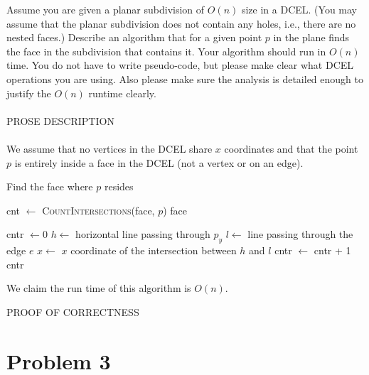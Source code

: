 \documentclass[11pt]{article}
\begin{document}
Assume you are given a planar subdivision of $O(n)$ size in a DCEL. (You may
assume that the planar subdivision does not contain any holes, i.e., there are
no nested faces.) Describe an algorithm that for a given point $p$ in the plane
finds the face in the subdivision that contains it. Your algorithm should run in
$O(n)$ time. You do not have to write pseudo-code, but please make clear what
DCEL operations you are using. Also please make sure the analysis is detailed
enough to justify the $O(n)$ runtime clearly. \\\\
\answer
PROSE DESCRIPTION \\\\
We assume that no vertices in the DCEL share $x$ coordinates and that the point $p$ is entirely inside a face in the DCEL (not a vertex or on an edge).

\begin{algorithm}
\caption{Find the face where $p$ resides}
    \label{alg:findface}
    \begin{algorithmic}[1]
            \State cnt $\gets$ \textsc{CountIntersections}(face, $p$)
                \State \Return face
            \EndIf
        \EndFor
    \EndFunction
    \end{algorithmic}

    \begin{algorithmic}[1]
        \State cntr $\gets 0$
        \State $h \gets$ horizontal line passing through $p_y$
            \State $l \gets$ line passing through the edge $e$
            \State $x \gets$ $x$ coordinate of the intersection between $h$ and $l$
                \State cntr $\gets$ cntr + 1
            \EndIf
        \EndFor
        \State \Return cntr
    \EndFunction
    \end{algorithmic}
\end{algorithm}

We claim the run time of this algorithm is $O(n)$.

PROOF OF CORRECTNESS

\newpage
\section*{Problem 3}
\end{document}
